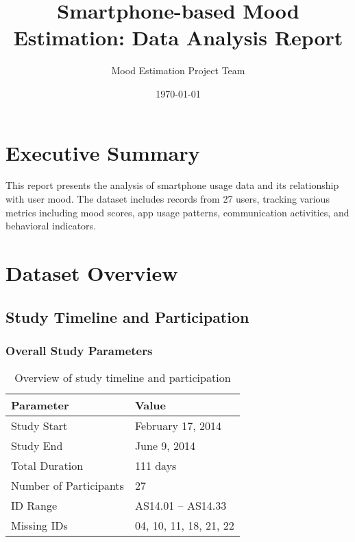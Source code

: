 \documentclass[11pt,a4paper]{article}
\title{Smartphone-based Mood Estimation: Data Analysis Report}
\author{Mood Estimation Project Team}
\date{\today}
\begin{document}
\maketitle

\section{Executive Summary}
This report presents the analysis of smartphone usage data and its relationship with user mood. The dataset includes records from 27 users, tracking various metrics including mood scores, app usage patterns, communication activities, and behavioral indicators.





\section{Dataset Overview}
\subsection{Study Timeline and Participation}

\subsubsection{Overall Study Parameters}
\begin{table}[h]
    \centering
    \begin{tabular}{ll}
        \toprule
        Parameter & Value \\
        \midrule
        Study Start & February 17, 2014 \\
        Study End & June 9, 2014 \\
        Total Duration & 111 days \\
        Number of Participants & 27 \\
        ID Range & AS14.01 -- AS14.33 \\
        Missing IDs & 04, 10, 11, 18, 21, 22 \\
        \bottomrule
    \end{tabular}
    \caption{Overview of study timeline and participation}
    \label{tab:study_overview}
\end{table}
\end{document}
